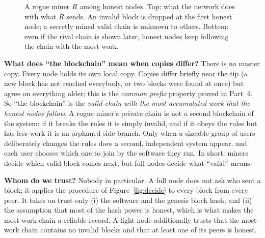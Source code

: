\documentclass[11pt,a4paper]{article}
\theoremstyle{definition}
\theoremstyle{plain}
\theoremstyle{remark}
\begin{document}
\begin{figure}[htbp]
\caption{A rogue miner $R$ among honest nodes. Top: what the network does with what $R$ sends. An invalid block is dropped at the first honest node; a secretly mined valid chain is unknown to others. Bottom: even if the rival chain is shown later, honest nodes keep following the chain with the most work.}
\label{fig:rogue}
\end{figure}

\textbf{What does ``the blockchain'' mean when copies differ?} There is no master copy. Every node holds its own local copy. Copies differ briefly near the tip (a new block has not reached everybody, or two blocks were found at once) but agree on everything older; this is the \emph{common prefix} property proved in Part~4. So ``the blockchain'' is the \emph{valid chain with the most accumulated work that the honest nodes follow}. A rogue miner's private chain is not a second blockchain of the system: if it breaks the rules it is simply invalid, and if it obeys the rules but has less work it is an orphaned side branch. Only when a sizeable group of users deliberately changes the rules does a second, independent system appear, and each user chooses which one to join by the software they run. In short: miners decide which valid block comes next, but full nodes decide what ``valid'' means.

\textbf{Whom do we trust?} Nobody in particular. A full node does not ask who sent a block; it applies the procedure of Figure~\ref{fig:decide} to every block from every peer. It takes on trust only (i) the software and the genesis block hash, and (ii) the assumption that most of the hash power is honest, which is what makes the most-work chain a reliable record. A light node additionally trusts that the most-work chain contains no invalid blocks and that at least one of its peers is honest.
\end{document}
